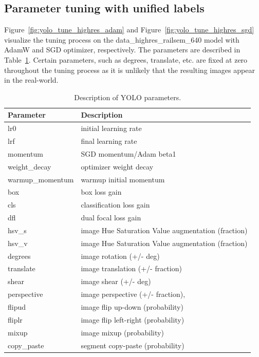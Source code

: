 \documentclass[Master,MDS,english]{BASE/twbook} %
\begin{document}

\subsection{Parameter tuning with unified labels} \label{app:yolo_parameters}

Figure~\ref{fig:yolo_tune_highres_adam} and Figure~\ref{fig:yolo_tune_highres_sgd} visualize the tuning process on the data\_highres\_railsem\_640 model  with AdamW and SGD optimizer, respectively.
The parameters are described in Table~\ref{tab:yolo_parameters}. Certain parameters, such as degrees, translate, etc. are fixed at zero throughout the tuning process as it is unlikely that the resulting images appear in the real-world.


\begin{table}[H]
\footnotesize
\centering
\begin{tabular}{|l|l|}
\hline
\textbf{Parameter} & \textbf{Description} \\ \hline
lr0 & initial learning rate \\ 
lrf & final learning rate \\ 
momentum & SGD momentum/Adam beta1 \\ 
weight\_decay & optimizer weight decay \\ 
warmup\_momentum & warmup initial momentum \\ 
box & box loss gain \\ 
cls & classification loss gain \\ 
dfl & dual focal loss gain \\ 
hsv\_s & image Hue Saturation Value augmentation (fraction) \\ 
hsv\_v & image Hue Saturation Value augmentation (fraction) \\ 
degrees & image rotation (+/- deg) \\ 
translate & image translation (+/- fraction) \\ 
shear & image shear (+/- deg) \\ 
perspective & image perspective (+/- fraction),\\ 
flipud & image flip up-down (probability) \\ 
fliplr & image flip left-right (probability) \\ 
mixup & image mixup (probability) \\ 
copy\_paste & segment copy-paste (probability) \\ \hline
\end{tabular}
\caption{Description of YOLO parameters.}
\label{tab:yolo_parameters}
\end{table}
\end{document}
